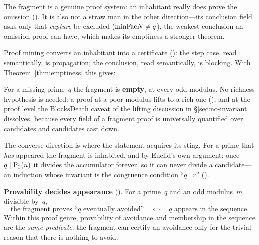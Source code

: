 The fragment is a genuine proof system: an inhabitant really does prove
the omission
().  It is also
not a straw man in the other direction---its conclusion field asks only
that \emph{capture} be excluded ($\mathrm{minFac} N \neq q$), the weakest
conclusion an omission proof can have, which makes its emptiness a
stronger theorem.

Proof mining converts an inhabitant into a certificate
(): the step case,
read semantically, is propagation; the conclusion, read semantically,
is blocking.  With Theorem~\ref{thm:emptiness} this gives:

\begin{theorem}
\label{thm:unprovability}
For a missing prime~$q$ the fragment is \textbf{empty}, at every odd
modulus.  No richness hypothesis is needed: a proof at a poor modulus
lifts to a rich one
(), and at the proof level the
$\mathrm{BlocksDeath}$ caveat of the lifting discussion in
\S\ref{sec:no-invariant} dissolves,
because every field of a fragment proof is universally quantified over
candidates and candidates cast down.
\end{theorem}

The converse direction is where the statement acquires its sting.  For a
prime that \emph{has} appeared the fragment is inhabited, and by
Euclid's own argument: once $q \mid \mathrm{P}_{2}(n)$ it divides the
accumulator forever, so it can never divide a candidate---an induction
whose invariant is the congruence condition ``$q \mid r$''
().

\begin{keyresult}
\textbf{Provability decides appearance}
().
For a prime~$q$ and an odd modulus~$m$ divisible by~$q$,
\[
  \text{the fragment proves ``$q$ eventually avoided''}
  \quad\Longleftrightarrow\quad
  \text{$q$ appears in the sequence.}
\]
Within this proof genre, provability of avoidance and membership in the
sequence are the \emph{same predicate}: the fragment can certify an
avoidance only for the trivial reason that there is nothing to avoid.
\end{keyresult}

